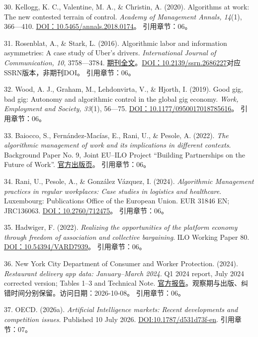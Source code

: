 \documentclass[UTF8,fontset=windows,12pt,a4paper,oneside,openany]{ctexbook}
\begin{document}
30. Kellogg, K. C., Valentine, M. A., \& Christin, A. (2020). Algorithms at work: The new contested terrain of control. \emph{Academy of Management Annals, 14}(1), 366—410. \href{https://doi.org/10.5465/annals.2018.0174}{DOI：10.5465/annals.2018.0174}。
引用章节：06。

31. Rosenblat, A., \& Stark, L. (2016). Algorithmic labor and information asymmetries: A case study of Uber’s drivers. \emph{International Journal of Communication, 10}, 3758—3784. \href{https://ijoc.org/index.php/ijoc/article/download/4892/1739}{期刊全文}。\href{https://doi.org/10.2139/ssrn.2686227}{DOI：10.2139/ssrn.2686227}对应SSRN版本，非期刊DOI。
引用章节：06。

32. Wood, A. J., Graham, M., Lehdonvirta, V., \& Hjorth, I. (2019). Good gig, bad gig: Autonomy and algorithmic control in the global gig economy. \emph{Work, Employment and Society, 33}(1), 56—75. \href{https://doi.org/10.1177/0950017018785616}{DOI：10.1177/0950017018785616}。
引用章节：06。

33. Baiocco, S., Fernández-Macías, E., Rani, U., \& Pesole, A. (2022). \emph{The algorithmic management of work and its implications in different contexts}. Background Paper No. 9, Joint EU–ILO Project “Building Partnerships on the Future of Work”. \href{https://www.ilo.org/publications/algorithmic-management-work-and-its-implications-different-contexts}{官方出版页}。
引用章节：06。

34. Rani, U., Pesole, A., \& González Vázquez, I. (2024). \emph{Algorithmic Management practices in regular workplaces: Case studies in logistics and healthcare}. Luxembourg: Publications Office of the European Union. EUR 31846 EN; JRC136063. \href{https://doi.org/10.2760/712475}{DOI：10.2760/712475}。
引用章节：06。

35. Hadwiger, F. (2022). \emph{Realizing the opportunities of the platform economy through freedom of association and collective bargaining}. ILO Working Paper 80. \href{https://doi.org/10.54394/VARD7939}{DOI：10.54394/VARD7939}。
引用章节：06。

36. New York City Department of Consumer and Worker Protection. (2024). \emph{Restaurant delivery app data: January–March 2024}. Q1 2024 report, July 2024 corrected version; Tables 1–3 and Technical Note. \href{https://www.nyc.gov/assets/dca/downloads/pdf/workers/Restaurant-Delivery-App-Data-Q1-2024.pdf}{官方报告}。观察期与出版、纠错时间分别保留。访问日期：2026-10-08。
引用章节：06。

37. OECD. (2026a). \emph{Artificial Intelligence markets: Recent developments and competition issues}. Published 10 July 2026. \href{https://doi.org/10.1787/d531d73f-en}{DOI:10.1787/d531d73f-en}.
引用章节：07。
\end{document}

